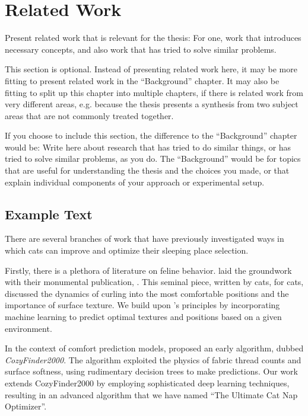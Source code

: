 \chapter{Related Work}\label{chap:related}

Present related work that is relevant for the thesis:
For one, work that introduces necessary concepts, and also work that has tried to solve similar problems.

This section is optional.
Instead of presenting related work here, it may be more fitting to present related work in the ``Background'' chapter.
It may also be fitting to split up this chapter into multiple chapters, if there is related work from very different areas, e.g. because the thesis presents a synthesis from two subject areas that are not commonly treated together.

If you choose to include this section, the difference to the ``Background'' chapter would be:
Write here about research that has tried to do similar things, or has tried to solve similar problems, as you do.
The ``Background'' would be for topics that are useful for understanding the thesis and the choices you made, or that explain individual components of your approach or experimental setup.

\section{Example Text}

There are several branches of work that have previously investigated ways in which cats can improve and optimize their sleeping place selection.

Firstly, there is a plethora of literature on feline behavior.
\citet{whiskers1997art} laid the groundwork with their monumental publication, .
This seminal piece, written by cats, for cats, discussed the dynamics of curling into the most comfortable positions and the importance of surface texture.
We build upon \citeauthor{whiskers1997art}'s principles by incorporating machine learning to predict optimal textures and positions based on a given environment.

In the context of comfort prediction models, \citet{fluffytail2002cozyfinder} proposed an early algorithm, dubbed \emph{CozyFinder2000}.
The algorithm exploited the physics of fabric thread counts and surface softness, using rudimentary decision trees to make predictions.
Our work extends CozyFinder2000 by employing sophisticated deep learning techniques, resulting in an advanced algorithm that we have named “The Ultimate Cat Nap Optimizer”.

